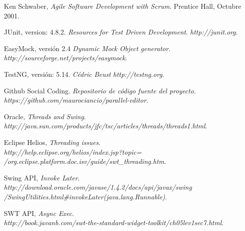 \documentclass[12pt,a4paper]{article}
\begin{document}
\begin{thebibliography}{9}
	Ken Schwaber,
	\emph{Agile Software Development with Scrum}.
	Prentice Hall, 
	Octubre 2001.

	JUnit, version: 4.8.2.
	\emph{Resources for Test Driven Development}.
	\textsl{http://junit.org}.

	EasyMock, versión 2.4
	\emph{Dynamic Mock Object generator}. \\
	\textsl{http://sourceforge.net/projects/easymock}.

	TestNG, versión: 5.14.
	\emph{Cédric Beust} 
	\textsl{http://testng.org}.

	Github Social Coding.
	\emph{Repositorio de código fuente del proyecto.} 
	\textsl{https://github.com/maurociancio/parallel-editor}.
	
	Oracle, \emph{Threads and Swing}. \\
	\textsl{http://java.sun.com/products/jfc/tsc/articles/threads/threads1.html}.

	Eclipse Helios, \emph{Threading issues}. \\
	\textsl{http://help.eclipse.org/helios/index.jsp?topic=\\
	/org.eclipse.platform.doc.isv/guide/swt\_threading.htm}.

	Swing API, \textsl{Invoke Later}. \\
	\textsl{http://download.oracle.com/javase/1.4.2/docs/api/javax/swing\\
	/SwingUtilities.html\#invokeLater(java.lang.Runnable)}.

	SWT API, \emph{Async Exec}. \\
	\textsl{http://book.javanb.com/swt-the-standard-widget-toolkit/ch05lev1sec7.html}.
\end{thebibliography}
\end{document}
